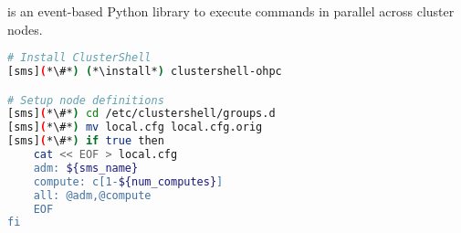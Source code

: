 \clustershell{} is an event-based Python library to execute commands in parallel
across cluster nodes. 

\begin{lstlisting}[language=bash,keywords={},upquote=true]
# Install ClusterShell
[sms](*\#*) (*\install*) clustershell-ohpc

# Setup node definitions
[sms](*\#*) cd /etc/clustershell/groups.d
[sms](*\#*) mv local.cfg local.cfg.orig
[sms](*\#*) if true then
    cat << EOF > local.cfg
    adm: ${sms_name}
    compute: c[1-${num_computes}]
    all: @adm,@compute
    EOF
fi
\end{lstlisting}

